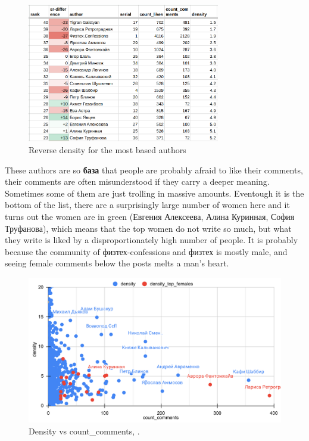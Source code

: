 \documentclass[
	12pt
] {article}
\begin{document}
	\begin{figure}[H]
		\centering
		\includegraphics[width=0.75\textwidth]{table-reverse-density}
		\caption{Reverse density for the most based authors}
		\label{table-reverse-density}
	\end{figure}

	These authors are so \textbf{база} that people are probably afraid to like their comments, their comments are often misunderstood if they carry a deeper meaning. Sometimes some of them are just trolling in massive amounts. Eventough it is the bottom of the list, there are a surprisingly large number of women here and it turns out the women are in green (Евгения Алексеева, Алина Куринная, София Труфанова), which means that the top women do not write so much, but what they write is liked by a disproportionately high number of people. It is probably because the community of физтех-confessions and физтех is mostly male, and seeing female comments below the posts melts a man's heart.

	\begin{figure}[H]
		\centering
		\includegraphics[width=1\textwidth]{fig-density-vs-count-comments}
		\caption{Density vs count\_comments, \cite{sheet-density-distribution}.}
		\label{fig-density-vs-count-comments}
	\end{figure}
\end{document}
